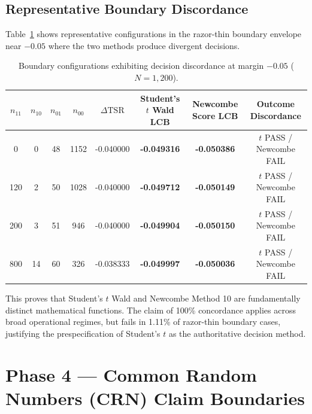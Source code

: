 \documentclass[10pt,a4paper]{article}
\begin{document}
\subsection{Representative Boundary Discordance}
Table~\ref{tab:discordance} shows representative configurations in the razor-thin boundary envelope near $-0.05$ where the two methods produce divergent decisions.

\begin{table}[htbp]
\centering
\small
\begin{tabularx}{\textwidth}{cccccccc}
\toprule
$n_{11}$ & $n_{10}$ & $n_{01}$ & $n_{00}$ & $\Delta\mathrm{TSR}$ & Student's $t$ Wald LCB & Newcombe Score LCB & Outcome Discordance \\
\midrule
0 & 0 & 48 & 1152 & -0.040000 & \textbf{-0.049316} & \textbf{-0.050386} & $t$ PASS / Newcombe FAIL \\
120 & 2 & 50 & 1028 & -0.040000 & \textbf{-0.049712} & \textbf{-0.050149} & $t$ PASS / Newcombe FAIL \\
200 & 3 & 51 & 946 & -0.040000 & \textbf{-0.049904} & \textbf{-0.050150} & $t$ PASS / Newcombe FAIL \\
800 & 14 & 60 & 326 & -0.038333 & \textbf{-0.049997} & \textbf{-0.050036} & $t$ PASS / Newcombe FAIL \\
\bottomrule
\end{tabularx}
\caption{Boundary configurations exhibiting decision discordance at margin $-0.05$ ($N = 1,200$).}
\label{tab:discordance}
\end{table}

This proves that Student's $t$ Wald and Newcombe Method 10 are fundamentally distinct mathematical functions. The claim of 100\% concordance applies across broad operational regimes, but fails in 1.11\% of razor-thin boundary cases, justifying the prespecification of Student's $t$ as the authoritative decision method.

\section{Phase 4 --- Common Random Numbers (CRN) Claim Boundaries}
\end{document}
